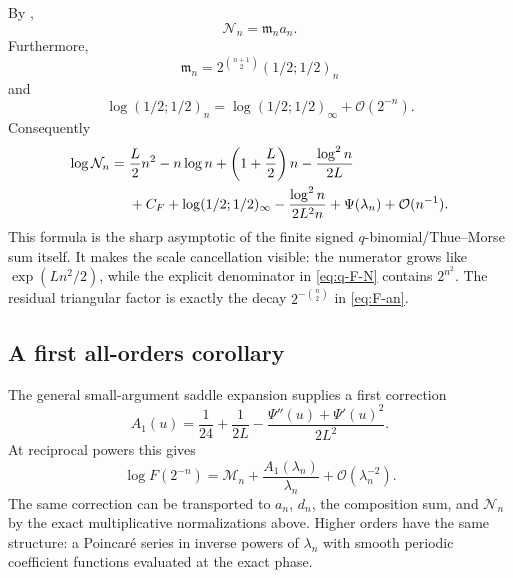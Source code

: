 \documentclass[11pt,oneside]{article}
\theoremstyle{definition}
\theoremstyle{remark}
\newcommand{\bigO}{\mathcal O}
\newcommand{\M}{\mathfrak m}
\begin{document}
By ,
\begin{equation}
 \mathcal N_n=\M_na_n.                                      \label{eq:N-product}
\end{equation}
Furthermore,
\begin{equation}
 \M_n=2^{\binom{n+1}{2}}(1/2;1/2)_n                       \label{eq:M-q}
\end{equation}
and
\begin{equation}
 \log(1/2;1/2)_n=
 \log(1/2;1/2)_\infty+\bigO(2^{-n}).                       \label{eq:qpoch-limit}
\end{equation}
Consequently
\begin{align}
 \log\mathcal N_n={}&\frac L2n^2-n\log n+
 \left(1+\frac L2\right)n-\frac{\log^2n}{2L}              \notag\\
 &+C_F+\log(1/2;1/2)_\infty
 -\frac{\log^2n}{2L^2n}+\Psi(\lambda_n)
 +\bigO(n^{-1}).                                            \label{eq:N-asymptotic}
\end{align}
This formula is the sharp asymptotic of the finite signed $q$-binomial/Thue--Morse sum itself.
It makes the scale cancellation visible: the numerator grows like
$\exp(Ln^2/2)$, while the explicit denominator in \eqref{eq:q-F-N} contains
$2^{n^2}$.  The residual triangular factor is exactly the decay
$2^{-\binom n2}$ in \eqref{eq:F-an}.

\subsection{A first all-orders corollary}

The general small-argument saddle expansion supplies a first correction
\begin{equation}
 A_1(u)=\frac1{24}+\frac1{2L}
 -\frac{\Psi''(u)+\Psi'(u)^2}{2L^2}.                        \label{eq:A1-report}
\end{equation}
At reciprocal powers this gives
\begin{equation}
 \log F(2^{-n})=\mathcal M_n+
 \frac{A_1(\lambda_n)}{\lambda_n}+
 \bigO(\lambda_n^{-2}).                                    \label{eq:first-correction-dyadic}
\end{equation}
The same correction can be transported to $a_n$, $d_n$, the composition sum, and
$\mathcal N_n$ by the exact multiplicative normalizations above.  Higher orders have the same
structure: a Poincar\'e series in inverse powers of $\lambda_n$ with smooth periodic
coefficient functions evaluated at the exact phase.
\end{document}
